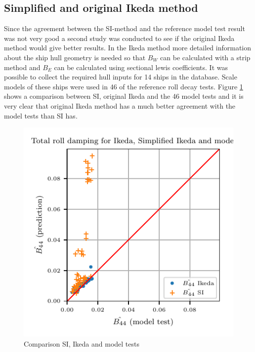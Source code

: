 \subsection{Simplified and original Ikeda method}
\label{se:si_ikeda_model}
Since the agreement between the SI-method and the reference model test result was not very good a second study was conducted to see if the original Ikeda method would give better results. In the Ikeda method more detailed information about the ship hull geometry is needed so that $B_W$ can be calculated with a strip method and $B_E$ can be calculated using sectional lewis coefficients. It was possible to collect the required hull inputs for 14 ships in the database. Scale models of these ships were used in 46 of the reference roll decay tests.
Figure \ref{fig:si_ikeda_model} shows a comparison between SI, original Ikeda and the 46 model tests and it is very clear that original Ikeda method has a much better agreement with the model tests than SI has.  

\begin{figure}[H]
    \centering
    \includegraphics[]{figures/si_ikeda_model.pdf}
        \vspace{-0.5cm}
    \caption{Comparison SI, Ikeda and model tests}
    \label{fig:si_ikeda_model}
\end{figure}

